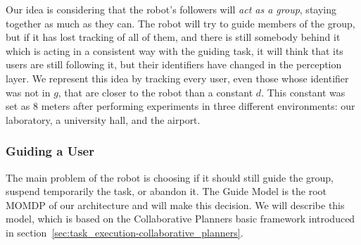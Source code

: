 Our idea is considering that the robot's followers will \textit{act as a group}, staying together as much as they can. The robot will try to guide members of the group, but if it has lost tracking of all of them, and there is still somebody behind it which is acting in a consistent way with the guiding task, it will think that its users are still following it, but their identifiers have changed in the perception layer. We represent this idea by tracking every user, even those whose identifier was not in $g$, that are closer to the robot than a constant $d$.  This constant was set as 8 meters after performing experiments in three different environments: our laboratory, a university hall, and the airport. 


\subsubsection{Guiding a User}
The main problem of the robot is choosing if it should still guide the group, suspend temporarily the task, or abandon it. The Guide Model is the root MOMDP of our architecture and will make this decision. We will describe this model, which is based on the Collaborative Planners basic framework introduced in section~\ref{sec:task_execution-collaborative_planners}.

